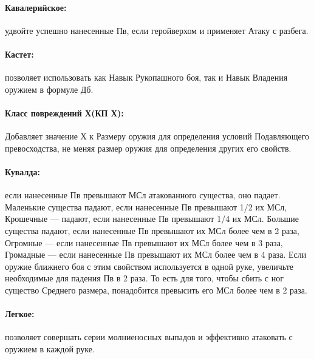 \paragraph{Кавалерийское:} удвойте успешно нанесенные Пв, если геройверхом и применяет Атаку с разбега.
\paragraph{Кастет:} позволяет использовать как Навык Рукопашного боя, так и Навык Владения оружием в формуле Дб.
\paragraph{Класс повреждений Х(КП Х):} Добавляет значение Х к Размеру оружия для определения условий Подавляющего превосходства, не меняя размер оружия для определения других его свойств.

\paragraph{Кувалда:} если нанесенные Пв превышают МСл атакованного существа, оно падает. 
\newline
Маленькие существа падают, если нанесенные Пв превышают 1/2 их МСл, Крошечные — падают, если нанесенные Пв превышают 1/4 их МСл.
\newline
Большие существа падают, если нанесенные Пв превышают их МСл более чем в 2 раза, Огромные — если нанесенные Пв превышают их МСл более чем в 3 раза, Громадные — если нанесенные Пв превышают их МСл более чем в 4 раза.
\newline
Если оружие ближнего боя с этим свойством используется в одной руке, увеличьте необходимые для падения Пв в 2 раза. То есть для того, чтобы сбить с ног существо Среднего размера, понадобится превысить его МСл более чем в 2 раза.
\paragraph{Легкое:} позволяет совершать серии молниеносных выпадов и эффективно атаковать с оружием в каждой руке.
